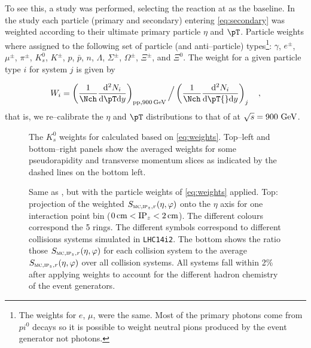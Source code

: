To see this, a study was performed, selecting the \ppCol{} reaction at
 as the baseline.  In the study each particle (primary
and secondary) entering \eqref{eq:secondary} was weighted according to
their ultimate primary particle $\eta$ and $\pT$.  Particle weights
where assigned to the following set of particle (and anti--particle)
types\footnote{The weights for $e$, $\mu$, were the same.  Most of the
  primary photons come from $pi^{0}$ decays so it is possible to
  weight neutral pions produced by the event generator not photons.}:
$\gamma$, 
$e^\pm$,
$\mu^\pm$,
$\pi^\pm$,
$K^0_{s}$, 
$K^\pm$,
$p$,
$\bar{p}$,
$n$,
$\Lambda$,
$\Sigma^\pm$,
$\Omega^\pm$,
$\Xi^\pm$, and
$\Xi^{0}$.
The weight for a given particle type $i$ for system $j$ is given by 

\begin{align}
  \label{eq:weights}
  W_{i}= \left(
  \frac1{\Nch}\diffFrac{^{2}N_{i}}{\pT\mathrm{d}y} \right)_{%
  \text{\ppCol{}},\GeV[900]{}} \Big/ 
  \left(\frac1{\Nch}\diffFrac{^{2}N_{i}}{\pT{}\mathrm{d}y}\right)_{j}\quad,
\end{align}
that is, we re--calibrate the $\eta$ and $\pT$ distributions to that
of \ppCol{} at $\usNN{pp}{0900}$. 

\begin{figure}[h!tbp]
  \centering
  \caption{The $K^{0}_{s}$ weights for \PbPbCol{} calculated based on
    \eqref{eq:weights}.  Top--left and bottom--right panels show the
    averaged weights for some pseudorapidity and transverse momentum
    slices as indicated by the dashed lines on the bottom left.}
  \label{fig:weights}
\end{figure} 

\begin{figure}[h!tbp]
 \centering
  \caption{Same as , but with the particle weights
    of \eqref{eq:weights} applied. Top: projection of the weighted
    $\SecMap$ onto the $\eta$ axis for one interaction point bin
    ($\unit[0]{cm}<\IPz{}<\unit[2]{cm}$).  The different colours
    correspond the 5 \FMD{} rings.  The different symbols correspond
    to different collisions systems simulated in \texttt{LHC14i2}.
    The bottom shows the ratio those $\SecMap$ for each collision
    system to the average $\SecMap$ over all collision systems. All
    systems fall within 2\% after applying weights to account for the
    different hadron chemistry of the event generators.}
  \label{fig:secmapweighted:all}
\end{figure} 

